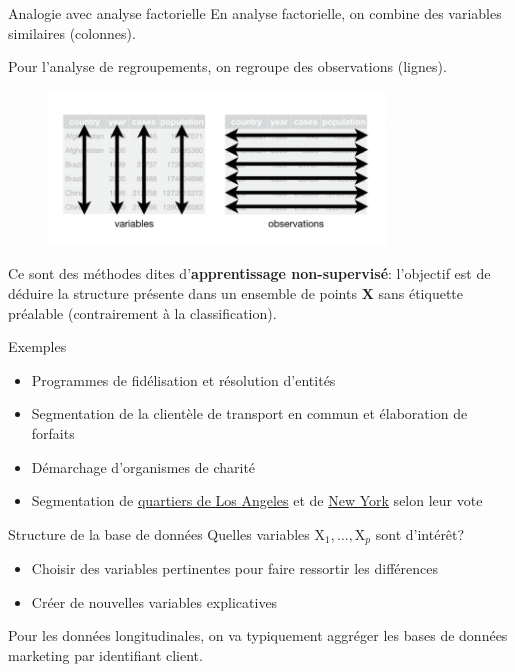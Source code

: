 \documentclass[
  ignorenonframetext,
]{beamer}
\providecommand{\tightlist}{%
  \setlength{\itemsep}{0pt}\setlength{\parskip}{0pt}}\usepackage{longtable,booktabs,array}
\begin{document}
\begin{frame}{Analogie avec analyse factorielle}
\protect\hypertarget{analogie-avec-analyse-factorielle}{}
En analyse factorielle, on combine des variables similaires (colonnes).

Pour l'analyse de regroupements, on regroupe des observations (lignes).

\begin{figure}

{\centering \includegraphics[width=0.8\textwidth,height=\textheight]{figures/tidy-data-sub.png}

}

\end{figure}

Ce sont des méthodes dites d'\textbf{apprentissage non-supervisé}:
l'objectif est de déduire la structure présente dans un ensemble de
points \(\mathbf{X}\) sans étiquette préalable (contrairement à la
classification).
\end{frame}

\begin{frame}{Exemples}
\protect\hypertarget{exemples}{}
\begin{itemize}
\tightlist
\item
  Programmes de fidélisation et résolution d'entités
\item
  Segmentation de la clientèle de transport en commun et élaboration de
  forfaits
\item
  Démarchage d'organismes de charité
\item
  Segmentation de
  \href{https://fivethirtyeight.com/features/the-6-political-neighborhoods-of-los-angeles/}{quartiers
  de Los Angeles} et de
  \href{https://fivethirtyeight.com/features/the-5-political-boroughs-of-new-york-city/}{New
  York} selon leur vote
\end{itemize}
\end{frame}

\begin{frame}{Structure de la base de données}
\protect\hypertarget{structure-de-la-base-de-donnuxe9es}{}
Quelles variables \(\mathrm{X}_1, \ldots, \mathrm{X}_p\) sont d'intérêt?

\begin{itemize}
\tightlist
\item
  Choisir des variables pertinentes pour faire ressortir les différences
\item
  Créer de nouvelles variables explicatives
\end{itemize}

Pour les données longitudinales, on va typiquement aggréger les bases de
données marketing par identifiant client.
\end{frame}
\end{document}
